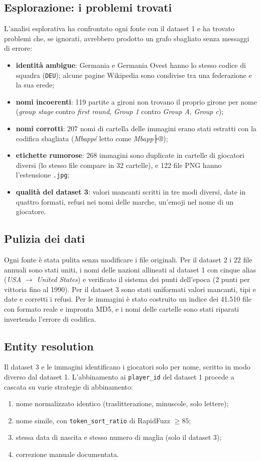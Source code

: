 \documentclass[11pt,a4paper]{article}
\newcommand{\code}[1]{\texttt{\small #1}}
\begin{document}
\subsection{Esplorazione: i problemi trovati}
L'analisi esplorativa ha confrontato ogni fonte con il dataset 1 e ha trovato problemi che, se ignorati, avrebbero prodotto un grafo sbagliato senza messaggi di errore:
\begin{itemize}
  \item \textbf{identità ambigue}: Germania e Germania Ovest hanno lo stesso codice di squadra (\code{DEU}); alcune pagine Wikipedia sono condivise tra una federazione e la sua erede;
  \item \textbf{nomi incoerenti}: 119 partite a gironi non trovano il proprio girone per nome (\emph{group stage} contro \emph{first round}, \emph{Group 1} contro \emph{Group A}, \emph{Group c});
  \item \textbf{nomi corrotti}: 207 nomi di cartella delle immagini erano stati estratti con la codifica sbagliata (\emph{Mbappé} letto come \emph{Mbapp├®});
  \item \textbf{etichette rumorose}: 268 immagini sono duplicate in cartelle di giocatori diversi (lo stesso file compare in 32 cartelle), e 122 file PNG hanno l'estensione \code{.jpg};
  \item \textbf{qualità del dataset 3}: valori mancanti scritti in tre modi diversi, date in quattro formati, refusi nei nomi delle marche, un'emoji nel nome di un giocatore.
\end{itemize}

\subsection{Pulizia dei dati}
Ogni fonte è stata pulita senza modificare i file originali. Per il dataset 2 i 22 file annuali sono stati uniti, i nomi delle nazioni allineati al dataset 1 con cinque alias (\emph{USA} $\to$ \emph{United States}) e verificato il sistema dei punti dell'epoca (2 punti per vittoria fino al 1990). Per il dataset 3 sono stati uniformati valori mancanti, tipi e date e corretti i refusi. Per le immagini è stato costruito un indice dei 41.510 file con formato reale e impronta MD5, e i nomi delle cartelle sono stati riparati invertendo l'errore di codifica.

\subsection{Entity resolution}
Il dataset 3 e le immagini identificano i giocatori solo per nome, scritto in modo diverso dal dataset 1. L'abbinamento ai \code{player\_id} del dataset 1 procede a cascata su varie strategie di abbinamento:
\begin{enumerate}
  \item nome normalizzato identico (traslitterazione, minuscole, solo lettere);
  \item nome simile, con \code{token\_sort\_ratio} di RapidFuzz $\geq 85$;
  \item stessa data di nascita e stesso numero di maglia (solo il dataset 3);
  \item correzione manuale documentata.
\end{enumerate}
\end{document}
